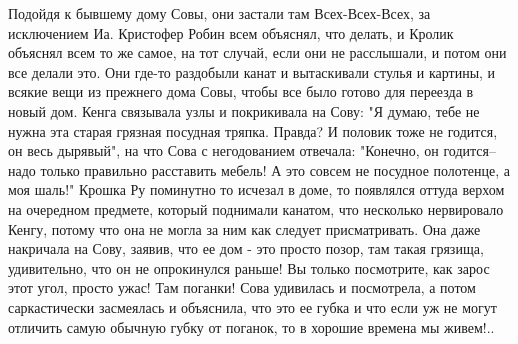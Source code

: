 Подойдя к бывшему дому Совы, они застали там Всех-Всех-Всех, за исключением Иа. 
Кристофер Робин всем объяснял, что делать, и Кролик объяснял всем то же самое, на тот случай, если они не расслышали, и потом они все делали это. 
Они где-то раздобыли канат и вытаскивали стулья и картины, и всякие вещи из прежнего дома Совы, чтобы все было готово для переезда в новый дом. 
Кенга связывала узлы и покрикивала на Сову: "Я думаю, тебе не нужна эта старая грязная посудная тряпка.  Правда? 
И половик тоже не годится, он весь дырявый", на что Сова с негодованием отвечала: "Конечно, он годится-- надо только правильно расставить мебель! 
А это совсем не посудное полотенце, а моя шаль!" 
Крошка Ру поминутно то исчезал в доме, то появлялся оттуда верхом на очередном предмете, который поднимали канатом, что несколько нервировало Кенгу, потому что она не могла за ним как следует присматривать. 
Она даже накричала на Сову, заявив, что ее дом - это просто позор, там такая грязища, удивительно, что он не опрокинулся раньше! 
Вы только посмотрите, как зарос этот угол, просто ужас!  Там поганки! 
Сова удивилась и посмотрела, а потом саркастически засмеялась и объяснила, что это ее губка и что если уж не могут отличить самую обычную губку от поганок, то в хорошие времена мы живем!..